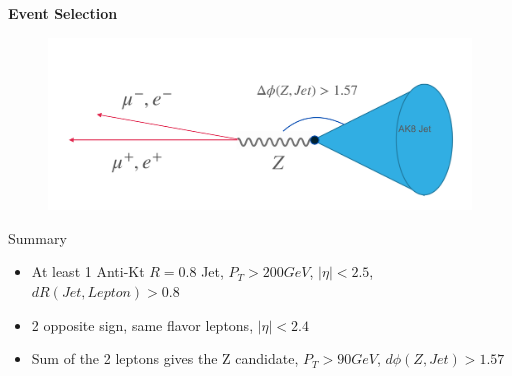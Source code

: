 \documentclass{beamer}
\begin{document}


\begin{frame}{\textbf{Event Selection}}
\vspace{.9mm}
\centering
\begin{figure}
\centering
\includegraphics[scale=.35]{zjetevent.png}
\end{figure}



 \begin{block}{Summary}
\begin{itemize}
  \item At least 1 Anti-Kt $R = 0.8$ Jet, $P_T > 200 GeV $,  $|\eta| < 2.5 $, $dR(Jet, Lepton) > 0.8 $  
  \item 2 opposite sign, same flavor leptons, $|\eta| < 2.4 $
  \item Sum of the 2 leptons gives the Z candidate, $P_T > 90 GeV$,  $d\phi(Z, Jet) > 1.57$  

\end{itemize}

\end{block}







\end{frame}




\end{document}
